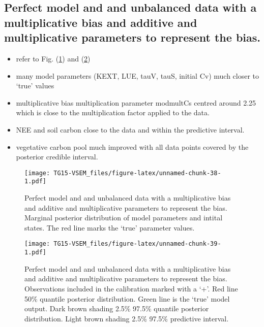 \documentclass[]{article}
\providecommand{\tightlist}{%
  \setlength{\itemsep}{0pt}\setlength{\parskip}{0pt}}
\begin{document}
\subsection{Perfect model and and unbalanced data with a multiplicative
bias and additive and multiplicative parameters to represent the
bias.}\label{perfect-model-and-and-unbalanced-data-with-a-multiplicative-bias-and-additive-and-multiplicative-parameters-to-represent-the-bias.}

\begin{itemize}
\tightlist
\item
  refer to Fig. (\ref{fig:perModunbalDataBiasmodLikePar}) and
  (\ref{fig:perModunbalDataBiasmodLikeOut})
\item
  many model parameters (KEXT, LUE, tauV, tauS, initial Cv) much closer
  to `true' values
\item
  multiplicative bias multiplication parameter modmultCs centred around
  2.25 which is close to the multiplication factor applied to the data.
\item
  NEE and soil carbon close to the data and within the predictive
  interval.
\item
  vegetative carbon pool much improved with all data points covered by
  the posterior credible interval.
\end{itemize}

\begin{figure}
\centering
\texttt{[image: TG15-VSEM\_files/figure-latex/unnamed-chunk-38-1.pdf]}
\caption{\label{fig:perModunbalDataBiasmodLikePar}Perfect model and and
unbalanced data with a multiplicative bias and additive and
multiplicative parameters to represent the bias. Marginal posterior
distribution of model parameters and intital states. The red line marks
the `true' parameter values.}
\end{figure}

\begin{figure}
\centering
\texttt{[image: TG15-VSEM\_files/figure-latex/unnamed-chunk-39-1.pdf]}
\caption{\label{fig:perModunbalDataBiasmodLikeOut}Perfect model and and
unbalanced data with a multiplicative bias and additive and
multiplicative parameters to represent the bias. Observations included
in the calibration marked with a `+'. Red line 50\% quantile posterior
distribution. Green line is the `true' model output. Dark brown shading
2.5\% 97.5\% quantile posterior distribution. Light brown shading 2.5\%
97.5\% predictive interval.}
\end{figure}
\end{document}
